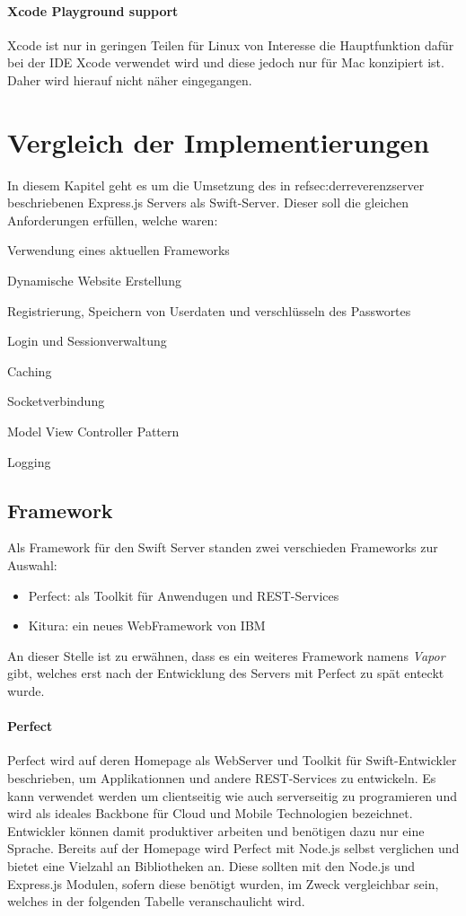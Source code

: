 \paragraph{Xcode Playground support}
Xcode ist nur in geringen Teilen für Linux von Interesse die Hauptfunktion dafür bei der IDE Xcode verwendet wird und diese jedoch nur für Mac konzipiert ist. Daher wird hierauf nicht näher eingegangen.


\section{Vergleich der Implementierungen}

In diesem Kapitel geht es um die Umsetzung des in ref{sec:derreverenzserver} beschriebenen Express.js Servers als Swift-Server. Dieser soll die gleichen Anforderungen erfüllen, welche waren:
\begin{inparaenum}
	\item Verwendung eines aktuellen Frameworks
	\item Dynamische Website Erstellung
	\item Registrierung, Speichern von Userdaten und verschlüsseln des Passwortes
	\item Login und Sessionverwaltung
	\item Caching
	\item Socketverbindung
	\item Model View Controller Pattern
	\item Logging
\end{inparaenum}

\subsection{Framework}
Als Framework für den Swift Server standen zwei verschieden Frameworks zur Auswahl: 
\begin{itemize}
	\item Perfect: als Toolkit für Anwendugen und REST-Services
	\item Kitura: ein neues WebFramework von IBM
\end{itemize}
An dieser Stelle ist zu erwähnen, dass es ein weiteres Framework namens \textit{Vapor} gibt, welches erst nach der Entwicklung des Servers mit Perfect zu spät enteckt wurde.

\paragraph{Perfect}
Perfect wird auf deren Homepage als WebServer und Toolkit für Swift-Entwickler beschrieben, um Applikationnen und andere REST-Services zu entwickeln. Es kann verwendet werden um clientseitig wie auch serverseitig zu programieren und wird als ideales Backbone für Cloud und Mobile Technologien bezeichnet. Entwickler können damit produktiver arbeiten und benötigen dazu nur eine Sprache. Bereits auf der Homepage wird Perfect mit Node.js selbst verglichen und bietet eine Vielzahl an Bibliotheken an. Diese sollten mit den Node.js und Express.js Modulen, sofern diese benötigt wurden, im Zweck vergleichbar sein, welches in der folgenden Tabelle veranschaulicht wird.

